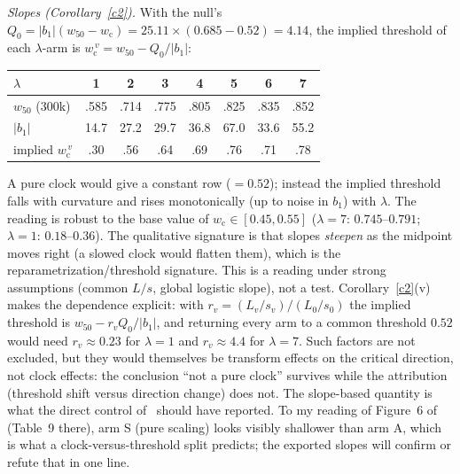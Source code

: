 \documentclass[11pt]{article}
\theoremstyle{definition}
\theoremstyle{remark}
\newcommand{\wcrit}{w_{\mathrm c}}
\newcommand{\wfifty}{w_{50}}
\begin{document}
\emph{Slopes (Corollary~\ref{c2}).} With the null's $Q_0=|b_1|(\wfifty-\wcrit)=25.11\times(0.685-0.52)=4.14$, the implied threshold of each $\lambda$-arm is $\wcrit^{\,v}=\wfifty-Q_0/|b_1|$:
\begin{center}\small
\begin{tabular}{lccccccc}
\toprule
$\lambda$ & 1 & 2 & 3 & 4 & 5 & 6 & 7\\
\midrule
$\wfifty$ (300k) & .585 & .714 & .775 & .805 & .825 & .835 & .852\\
$|b_1|$ & 14.7 & 27.2 & 29.7 & 36.8 & 67.0 & 33.6 & 55.2\\
implied $\wcrit^{\,v}$ & .30 & .56 & .64 & .69 & .76 & .71 & .78\\
\bottomrule
\end{tabular}
\end{center}
A pure clock would give a constant row ($=0.52$); instead the implied threshold falls with curvature and rises monotonically (up to noise in $b_1$) with $\lambda$. The reading is robust to the base value of $\wcrit\in[0.45,0.55]$ ($\lambda=7$: $0.745$--$0.791$; $\lambda=1$: $0.18$--$0.36$). The qualitative signature is that slopes \emph{steepen} as the midpoint moves right (a slowed clock would flatten them), which is the reparametrization/threshold signature. This is a reading under strong assumptions (common $L/s$, global logistic slope), not a test. Corollary~\ref{c2}(v) makes the dependence explicit: with $r_v=(L_v/s_v)/(L_0/s_0)$ the implied threshold is $\wfifty-r_vQ_0/|b_1|$, and returning every arm to a common threshold $0.52$ would need $r_v\approx0.23$ for $\lambda=1$ and $r_v\approx4.4$ for $\lambda=7$. Such factors are not excluded, but they would themselves be transform effects on the critical direction, not clock effects: the conclusion ``not a pure clock'' survives while the attribution (threshold shift versus direction change) does not. The slope-based quantity is what the direct control of~\cite{P} should have reported. To my reading of Figure~6 of~\cite{P} (Table~9 there), arm S (pure scaling) looks visibly shallower than arm A, which is what a clock-versus-threshold split predicts; the exported slopes will confirm or refute that in one line.
\end{document}
